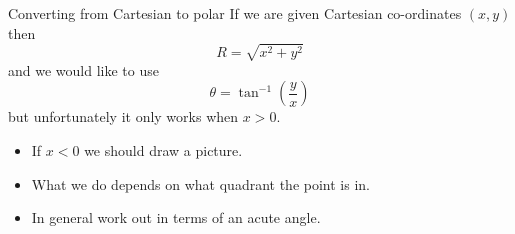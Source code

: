 \documentclass{beamer}
\begin{document}
\begin{frame}{Converting from Cartesian to polar}
If we are given Cartesian co-ordinates $(x, y)$ then
\begin{equation*}
R = \sqrt{x^2+y^2}
\end{equation*}
and we would like to use
\begin{equation*}
\theta = \tan^{-1}\left(\frac{y}{x}\right)
\end{equation*}
but unfortunately it only works when $x>0$.\vfill
\begin{itemize}
	\item If $x<0$ we should draw a picture.
	\item What we do depends on what quadrant the point is in.
	\item In general work out in terms of an acute angle.
\end{itemize}
\end{frame}
\end{document}
